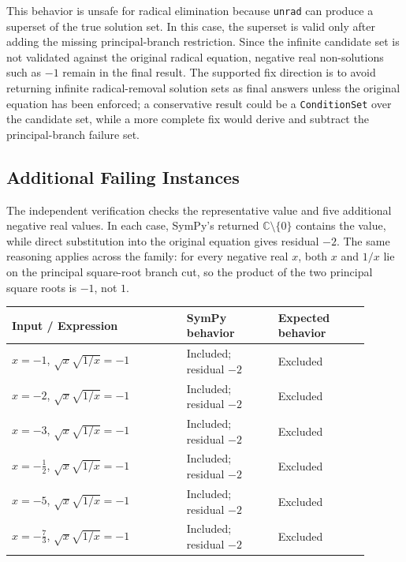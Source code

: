 \documentclass[11pt]{article}
\begin{document}
This behavior is unsafe for radical elimination because \texttt{unrad} can
produce a superset of the true solution set. In this case, the superset is valid
only after adding the missing principal-branch restriction. Since the infinite
candidate set is not validated against the original radical equation, negative
real non-solutions such as \(-1\) remain in the final result. The supported fix
direction is to avoid returning infinite radical-removal solution sets as final
answers unless the original equation has been enforced; a conservative result
could be a \texttt{ConditionSet} over the candidate set, while a more complete
fix would derive and subtract the principal-branch failure set.

\subsection{Additional Failing Instances}

The independent verification checks the representative value and five additional
negative real values. In each case, SymPy's returned
\(\mathbb{C}\setminus\{0\}\) contains the value, while direct substitution into
the original equation gives residual \(-2\). The same reasoning applies across
the family: for every negative real \(x\), both \(x\) and \(1/x\) lie on the
principal square-root branch cut, so the product of the two principal square
roots is \(-1\), not \(1\).

\begin{center}
\small
\renewcommand{\arraystretch}{1.3}
\begin{tabular}{@{}>{\raggedright\arraybackslash}p{0.44\linewidth}>{\raggedright\arraybackslash}p{0.23\linewidth}>{\raggedright\arraybackslash}p{0.23\linewidth}@{}}
\toprule
\textbf{Input / Expression} & \textbf{SymPy behavior} & \textbf{Expected behavior} \\
\midrule
\(x=-1\), \(\sqrt{x}\sqrt{1/x}=-1\) & Included; residual \(-2\) & Excluded \\
\(x=-2\), \(\sqrt{x}\sqrt{1/x}=-1\) & Included; residual \(-2\) & Excluded \\
\(x=-3\), \(\sqrt{x}\sqrt{1/x}=-1\) & Included; residual \(-2\) & Excluded \\
\(x=-\frac{1}{2}\), \(\sqrt{x}\sqrt{1/x}=-1\) & Included; residual \(-2\) & Excluded \\
\(x=-5\), \(\sqrt{x}\sqrt{1/x}=-1\) & Included; residual \(-2\) & Excluded \\
\(x=-\frac{7}{3}\), \(\sqrt{x}\sqrt{1/x}=-1\) & Included; residual \(-2\) & Excluded \\
\bottomrule
\end{tabular}
\end{center}
\end{document}
